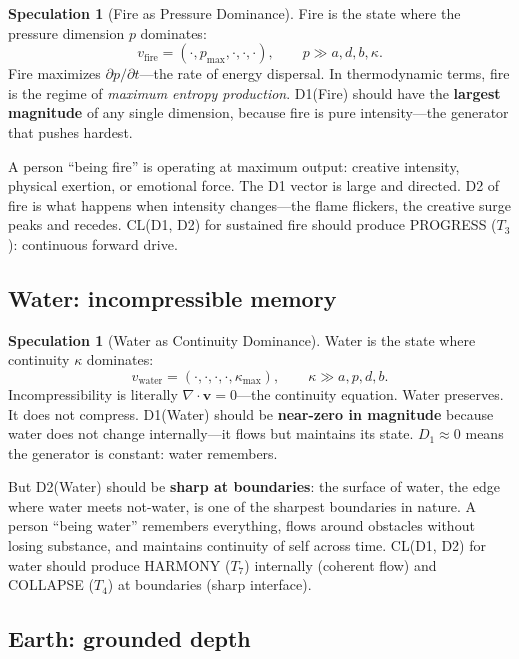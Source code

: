 \documentclass[11pt]{article}
\theoremstyle{definition}
\newtheorem{speculation}[theorem]{Speculation}
\theoremstyle{remark}
\begin{document}
\begin{speculation}[Fire as Pressure Dominance]
\label{spec:fire}
Fire is the state where the pressure dimension $p$ dominates:
\[
  v_{\text{fire}} = (\cdot, p_{\max}, \cdot, \cdot, \cdot), \qquad p \gg a, d, b, \kappa.
\]
Fire maximizes $\partial p / \partial t$---the rate of energy dispersal.  In
thermodynamic terms, fire is the regime of \emph{maximum entropy production}.
D1(Fire) should have the \textbf{largest magnitude} of any single dimension,
because fire is pure intensity---the generator that pushes hardest.

A person ``being fire'' is operating at maximum output: creative intensity,
physical exertion, or emotional force.  The D1 vector is large and directed.
D2 of fire is what happens when intensity changes---the flame flickers, the
creative surge peaks and recedes.  CL(D1, D2) for sustained fire should
produce PROGRESS ($T_3$): continuous forward drive.
\end{speculation}

\subsection{Water: incompressible memory}

\begin{speculation}[Water as Continuity Dominance]
\label{spec:water}
Water is the state where continuity $\kappa$ dominates:
\[
  v_{\text{water}} = (\cdot, \cdot, \cdot, \cdot, \kappa_{\max}), \qquad \kappa \gg a, p, d, b.
\]
Incompressibility is literally $\nabla \cdot \mathbf{v} = 0$---the continuity equation.
Water preserves.  It does not compress.  D1(Water) should be \textbf{near-zero in magnitude}
because water does not change internally---it flows but maintains its state.  $D_1 \approx 0$
means the generator is constant: water remembers.

But D2(Water) should be \textbf{sharp at boundaries}: the surface of water, the
edge where water meets not-water, is one of the sharpest boundaries in nature.
A person ``being water'' remembers everything, flows around obstacles without losing
substance, and maintains continuity of self across time.
CL(D1, D2) for water should produce HARMONY ($T_7$) internally (coherent flow)
and COLLAPSE ($T_4$) at boundaries (sharp interface).
\end{speculation}

\subsection{Earth: grounded depth}
\end{document}
